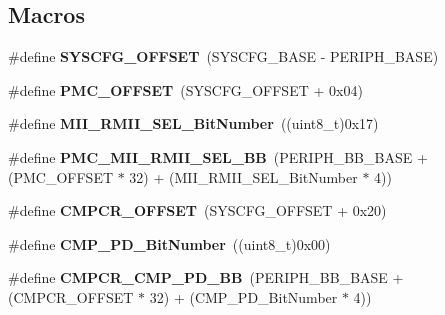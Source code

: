 \subsection*{Macros}
\begin{DoxyCompactItemize}
\item 
\hypertarget{group___s_y_s_c_f_g_ga13f7abe3641989d4d063ad21962da8b0}{\#define {\bfseries S\-Y\-S\-C\-F\-G\-\_\-\-O\-F\-F\-S\-E\-T}~(S\-Y\-S\-C\-F\-G\-\_\-\-B\-A\-S\-E -\/ P\-E\-R\-I\-P\-H\-\_\-\-B\-A\-S\-E)}\label{group___s_y_s_c_f_g_ga13f7abe3641989d4d063ad21962da8b0}

\item 
\hypertarget{group___s_y_s_c_f_g_ga505f7263c4ca98810cca19505752d61d}{\#define {\bfseries P\-M\-C\-\_\-\-O\-F\-F\-S\-E\-T}~(S\-Y\-S\-C\-F\-G\-\_\-\-O\-F\-F\-S\-E\-T + 0x04)}\label{group___s_y_s_c_f_g_ga505f7263c4ca98810cca19505752d61d}

\item 
\hypertarget{group___s_y_s_c_f_g_gad4a9bbd669109039291f942d923ff8ae}{\#define {\bfseries M\-I\-I\-\_\-\-R\-M\-I\-I\-\_\-\-S\-E\-L\-\_\-\-Bit\-Number}~((uint8\-\_\-t)0x17)}\label{group___s_y_s_c_f_g_gad4a9bbd669109039291f942d923ff8ae}

\item 
\hypertarget{group___s_y_s_c_f_g_ga06dbfd74f07783e68f03797038cd9457}{\#define {\bfseries P\-M\-C\-\_\-\-M\-I\-I\-\_\-\-R\-M\-I\-I\-\_\-\-S\-E\-L\-\_\-\-B\-B}~(P\-E\-R\-I\-P\-H\-\_\-\-B\-B\-\_\-\-B\-A\-S\-E + (P\-M\-C\-\_\-\-O\-F\-F\-S\-E\-T $\ast$ 32) + (M\-I\-I\-\_\-\-R\-M\-I\-I\-\_\-\-S\-E\-L\-\_\-\-Bit\-Number $\ast$ 4))}\label{group___s_y_s_c_f_g_ga06dbfd74f07783e68f03797038cd9457}

\item 
\hypertarget{group___s_y_s_c_f_g_ga8e5fbe846e7478d522df749672b90084}{\#define {\bfseries C\-M\-P\-C\-R\-\_\-\-O\-F\-F\-S\-E\-T}~(S\-Y\-S\-C\-F\-G\-\_\-\-O\-F\-F\-S\-E\-T + 0x20)}\label{group___s_y_s_c_f_g_ga8e5fbe846e7478d522df749672b90084}

\item 
\hypertarget{group___s_y_s_c_f_g_ga0ca336e48ea4840c7d1cde05a0e07e82}{\#define {\bfseries C\-M\-P\-\_\-\-P\-D\-\_\-\-Bit\-Number}~((uint8\-\_\-t)0x00)}\label{group___s_y_s_c_f_g_ga0ca336e48ea4840c7d1cde05a0e07e82}

\item 
\hypertarget{group___s_y_s_c_f_g_gae4516ed27e02d84d9d20c7d711b87437}{\#define {\bfseries C\-M\-P\-C\-R\-\_\-\-C\-M\-P\-\_\-\-P\-D\-\_\-\-B\-B}~(P\-E\-R\-I\-P\-H\-\_\-\-B\-B\-\_\-\-B\-A\-S\-E + (C\-M\-P\-C\-R\-\_\-\-O\-F\-F\-S\-E\-T $\ast$ 32) + (C\-M\-P\-\_\-\-P\-D\-\_\-\-Bit\-Number $\ast$ 4))}\label{group___s_y_s_c_f_g_gae4516ed27e02d84d9d20c7d711b87437}

\end{DoxyCompactItemize}
